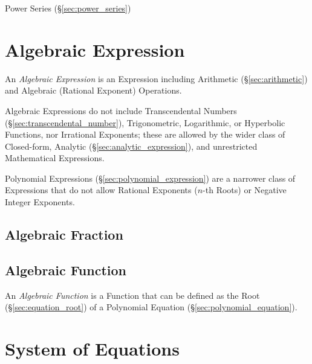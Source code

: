 \fist Power Series (\S\ref{sec:power_series})



\section{Algebraic Expression}\label{sec:algebraic_expression}

An \emph{Algebraic Expression} is an Expression including Arithmetic
(\S\ref{sec:arithmetic}) and Algebraic (Rational Exponent) Operations.

Algebraic Expressions do not include Transcendental Numbers
(\S\ref{sec:transcendental_number}), Trigonometric, Logarithmic, or Hyperbolic
Functions, nor Irrational Exponents; these are allowed by the wider class of
Closed-form, Analytic (\S\ref{sec:analytic_expression}), and unrestricted
Mathematical Expressions.

\fist Polynomial Expressions (\S\ref{sec:polynomial_expression}) are a narrower
class of Expressions that do not allow Rational Exponents ($n$-th Roots) or
Negative Integer Exponents.



\subsection{Algebraic Fraction}\label{sec:algebraic_fraction}

\subsection{Algebraic Function}\label{sec:algebraic_function}

An \emph{Algebraic Function} is a Function that can be defined as the Root
(\S\ref{sec:equation_root}) of a Polynomial Equation
(\S\ref{sec:polynomial_equation}).



\section{System of Equations}\label{sec:system_of_equations}

